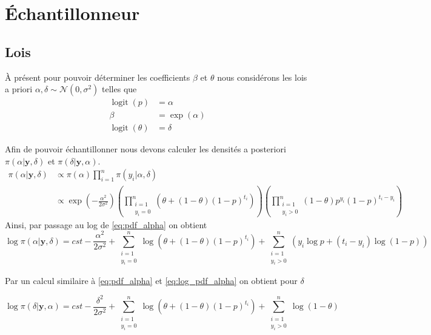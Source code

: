 \section{\'Echantillonneur}

\subsection{Lois}

\`A présent pour pouvoir déterminer les coefficients $\beta$ et $\theta$ nous considérons les lois a priori $\alpha, \delta \sim \mathcal N(0, \sigma^2)$ telles que
\begin{align*}
    \operatorname{logit}(p) &= \alpha \\
    \beta &= \exp(\alpha) \\
    \operatorname{logit}(\theta) &= \delta
\end{align*}

Afin de pouvoir échantillonner nous devons calculer les densités a posteriori $\pi(\alpha | \mathbf y, \delta)$ et $\pi(\delta | \mathbf y, \alpha)$.
\begin{align}
    \pi(\alpha | \mathbf y, \delta) &\propto \pi(\alpha) \prod_{i = 1}^n{\pi(y_i | \alpha, \delta)} \nonumber \\
    &\propto \exp\left(-\frac{\alpha^2}{2\sigma^2}\right) \left(\prod_{\substack{i = 1 \\ y_i = 0}}^n(\theta + (1-\theta)(1-p)^{t_i})\right) \left(\prod_{\substack{i = 1 \\ y_i > 0}}^n(1-\theta)p^{y_i}(1-p)^{t_i-y_i}\right)
    \label{eq:pdf_alpha}
\end{align}
Ainsi, par passage au log de \eqref{eq:pdf_alpha} on obtient
\begin{equation}
    \log \pi(\alpha | \mathbf y, \delta) = cst - \frac{\alpha^2}{2\sigma^2} + \sum_{\substack{i = 1 \\ y_i = 0}}^n\log(\theta + (1-\theta)(1-p)^{t_i}) + \sum_{\substack{i = 1 \\ y_i > 0}}^n(y_i\log{p} + (t_i-y_i)\log(1-p))
    \label{eq:log_pdf_alpha}
\end{equation}

Par un calcul similaire à \eqref{eq:pdf_alpha} et \eqref{eq:log_pdf_alpha} on obtient pour $\delta$

\begin{equation}
    \log \pi(\delta | \mathbf y, \alpha) = cst - \frac{\delta^2}{2\sigma^2} + \sum_{\substack{i = 1 \\ y_i = 0}}^n\log(\theta + (1-\theta)(1-p)^{t_i}) + \sum_{\substack{i = 1 \\ y_i > 0}}^n\log(1-\theta)
    \label{eq:log_pdf_delta}
\end{equation}

